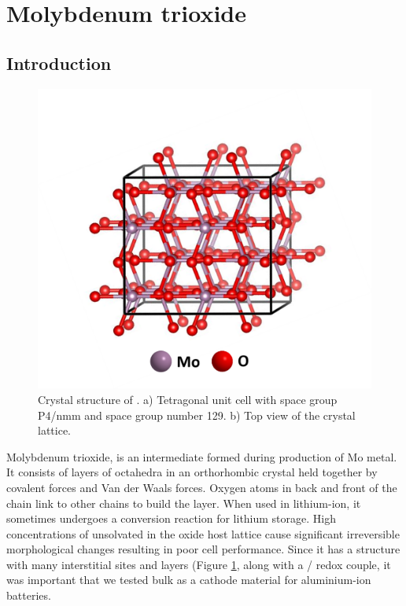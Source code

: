 \section{Molybdenum trioxide}

\subsection{Introduction}

 \begin{figure}[th!]
  \centering
  \includegraphics[width=\textwidth]{Figures/chap6fig/MoO3crys}
    \caption{Crystal structure of . a) Tetragonal unit cell with space group P4/nmm and space group number 129. b) Top view of the crystal lattice.}
  \label{Figures/chap6fig:MoO3crys}
\end{figure}

Molybdenum trioxide,  is an intermediate formed during production of Mo metal. It consists of layers of  octahedra in an orthorhombic crystal held together by covalent forces and Van der Waals forces. Oxygen atoms in back and front of the chain link to other chains to build the layer. When used in lithium-ion, it sometimes undergoes a conversion reaction for lithium storage. High concentrations of unsolvated  in the oxide host lattice cause significant irreversible morphological changes resulting in poor cell performance.
Since it has a structure with many interstitial sites and layers (Figure \ref{Figures/chap6fig:MoO3crys}, along with a / redox couple, it was important that we tested bulk  as a cathode material for aluminium-ion batteries.


